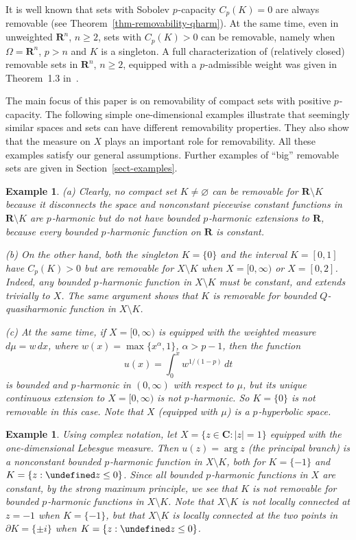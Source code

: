 \documentclass[a4paper,twoside]{article}
\theoremstyle{propositional}
\theoremstyle{descriptive}
\newtheorem{example}[thm]{Example}
\theoremstyle{remarkstyle}
\newcommand{\setm}{\setminus}
\renewcommand{\emptyset}{\varnothing}
\newcommand{\Cp}{{C_p}}
\let\Re\undefined \DeclareMathOperator{\Re}{Re}
\newcommand{\bdry}{\partial}
\newcommand{\bdy}{\bdry}
\newcommand{\al}{\alpha}
\newcommand{\Om}{\Omega}
\newcommand{\p}{{$p\mspace{1mu}$}}
\newcommand{\R}{\mathbf{R}}
\newcommand{\C}{\mathbf{C}}
\newcommand{\Rn}{\mathbf{R}^n}
\numberwithin{equation}{section}
\begin{document}
It is well known that sets with Sobolev \p-capacity 
$\Cp(K)=0$ are always removable (see Theorem~\ref{thm-removability-qharm}).
At the same time, even in unweighted $\Rn$, $n \ge 2$,
sets with $\Cp(K)>0$ can be removable,
namely when $\Om=\Rn$, $p>n$ and $K$ is a singleton.
A full characterization of (relatively closed) removable sets 
in $\Rn$, $n \ge 2$, equipped with a \p-admissible weight
was given in Theorem~1.3 in~\cite{ABRnremove}.





The main focus of this paper is on removability of
compact sets with positive \p-capacity.
The following  simple one-dimensional examples    
illustrate that seemingly similar spaces and sets can 
have different removability properties.
They also show that the measure on $X$ plays an important role
for removability.
All these examples satisfy our general assumptions.
Further examples of ``big'' removable sets are given
in Section~\ref{sect-examples}.


\begin{example} \label{ex-interval-new}
(a)
Clearly, no compact set $K\ne\emptyset$ can be removable for 
$\R\setm K$ because it disconnects the space and 
nonconstant piecewise constant functions
in $\R\setm K$ are \p-harmonic but do not have 
bounded \p-harmonic extensions to $\R$,
because every bounded \p-harmonic function on $\R$ is constant.


(b)
On the other hand, both the singleton $K=\{0\}$ and the interval
$K=[0,1]$ have $\Cp(K)>0$ but
are removable for $X\setm K$ when $X=[0,\infty)$
or $X=[0,2]$.
Indeed, 
any bounded \p-harmonic 
function in $X \setm K$ must be constant,
and extends trivially to $X$.
The same argument shows that $K$ is removable
for bounded $Q$-quasiharmonic 
function in $X \setm K$.

(c)
At the same time, if $X=[0,\infty)$ is equipped with the
weighted measure $d\mu=w\,dx$, where $w(x)=\max\{x^\al,1\}$, $\al>p-1$,
then the function
\[
u(x)=\int_0^{x} w^{1/(1-p)}\,dt
\] 
is bounded and \p-harmonic in $(0,\infty)$
with respect to $\mu$, but its unique continuous extension to $X=[0,\infty)$
is not \p-harmonic.
So $K=\{0\}$ is not removable in this case.
Note that $X$  (equipped with $\mu$) is a \p-hyperbolic space.
\end{example}


\begin{example} \label{ex-circle-new}
Using complex notation, let $X=\{z \in \C : |z|=1\}$ 
equipped with the one-dimensional Lebesgue measure.
Then $u(z)=\arg z$ (the principal branch) 
is a nonconstant
bounded \p-harmonic function in $X \setm K$,
both for $K=\{-1\}$ and $K=\{z : \Re z \le 0\}$.
Since all bounded \p-harmonic functions in $X$ are constant,
by the strong maximum principle, we see that
$K$ is not removable for bounded \p-harmonic
functions in $X \setm K$.
Note  that $X \setm K$ is not locally connected at $z=-1$
when $K=\{-1\}$, but that $X \setm K$ is locally 
connected at the two points in $\bdy K = \{\pm i\}$
when $K=\{z : \Re z \le 0\}$.
\end{example}
\end{document}
